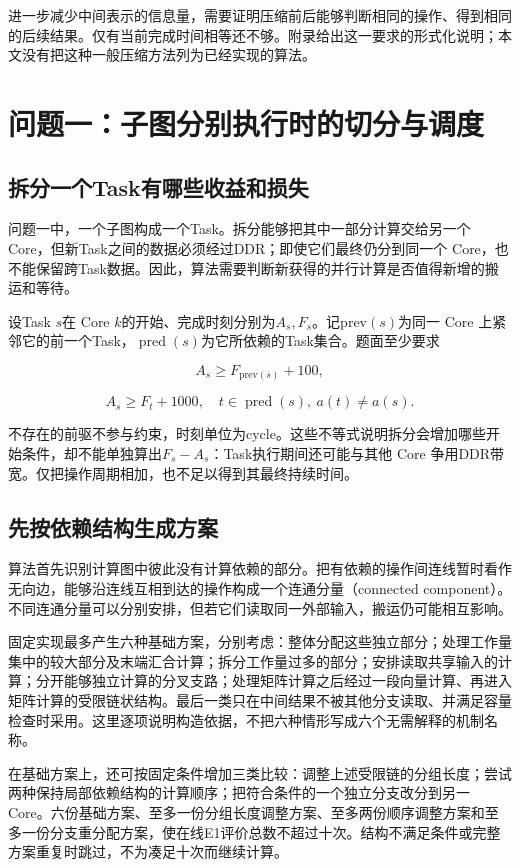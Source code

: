 \documentclass[anonymous,notoc]{gmcm2026}
\begin{document}
进一步减少中间表示的信息量，需要证明压缩前后能够判断相同的操作、得到相同的后续结果。仅有当前完成时间相等还不够。附录给出这一要求的形式化说明；本文没有把这种一般压缩方法列为已经实现的算法。


\section{问题一：子图分别执行时的切分与调度}

\subsection{拆分一个Task有哪些收益和损失}

问题一中，一个子图构成一个Task。拆分能够把其中一部分计算交给另一个 Core，但新Task之间的数据必须经过DDR；即使它们最终仍分到同一个 Core，也不能保留跨Task数据。因此，算法需要判断新获得的并行计算是否值得新增的搬运和等待。

设Task \(s\)在 Core \(k\)的开始、完成时刻分别为\(A_s,F_s\)。记\(\mathrm{prev}(s)\)为同一 Core 上紧邻它的前一个Task，\(\operatorname{pred}(s)\)为它所依赖的Task集合。题面至少要求

\[A_s\ge F_{\mathrm{prev}(s)}+100,\]

\[A_s\ge F_t+1000,\quad t\in\operatorname{pred}(s),\ a(t)\ne a(s).\]

不存在的前驱不参与约束，时刻单位为cycle。这些不等式说明拆分会增加哪些开始条件，却不能单独算出\(F_s-A_s\)：Task执行期间还可能与其他 Core 争用DDR带宽。仅把操作周期相加，也不足以得到其最终持续时间。

\subsection{先按依赖结构生成方案}

算法首先识别计算图中彼此没有计算依赖的部分。把有依赖的操作间连线暂时看作无向边，能够沿连线互相到达的操作构成一个连通分量（connected component）。不同连通分量可以分别安排，但若它们读取同一外部输入，搬运仍可能相互影响。

固定实现最多产生六种基础方案，分别考虑：整体分配这些独立部分；处理工作量集中的较大部分及末端汇合计算；拆分工作量过多的部分；安排读取共享输入的计算；分开能够独立计算的分叉支路；处理矩阵计算之后经过一段向量计算、再进入矩阵计算的受限链状结构。最后一类只在中间结果不被其他分支读取、并满足容量检查时采用。这里逐项说明构造依据，不把六种情形写成六个无需解释的机制名称。

在基础方案上，还可按固定条件增加三类比较：调整上述受限链的分组长度；尝试两种保持局部依赖结构的计算顺序；把符合条件的一个独立分支改分到另一 Core。六份基础方案、至多一份分组长度调整方案、至多两份顺序调整方案和至多一份分支重分配方案，使在线E1评价总数不超过十次。结构不满足条件或完整方案重复时跳过，不为凑足十次而继续计算。
\end{document}
